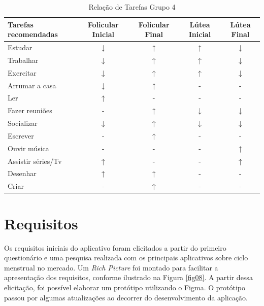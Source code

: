 \begin{table}[ht]
    \centering
    \caption{Relação de Tarefas Grupo 4}
    \label{tab14}
    \begin{tabular}{lcccc}
    \toprule
    Tarefas recomendadas  & Folicular Inicial & Folicular Final  & Lútea Inicial& Lútea Final \\ 
    \midrule
    Estudar & $\downarrow$  & $\uparrow$ & $\uparrow$ & $\downarrow$ \\ 
    \midrule
    Trabalhar & $\downarrow$ & $\uparrow$  & $\uparrow$ &  $\downarrow$  \\ 
    \midrule
    Exercitar & $\downarrow$ & $\uparrow$ & $\uparrow$ &  $\downarrow$  \\ 
    \midrule
    Arrumar a casa  & $\downarrow$ & $\uparrow$  & - & - \\ 
    \midrule
    Ler & $\uparrow$ & -  & - & - \\ 
    \midrule
    Fazer reuniões & - & $\uparrow$ & $\downarrow$ & $\downarrow$ \\ 
    \midrule
    Socializar & $\downarrow$ & $\uparrow$  & $\downarrow$ & $\downarrow$ \\ 
    \midrule
    Escrever & - & $\uparrow$  & - & - \\ 
    \midrule
    Ouvir música & - & - & - & $\uparrow$ \\ 
    \midrule
    Assistir séries/Tv & $\uparrow$ & - & - & $\uparrow$ \\ 
    \midrule
    Desenhar & $\uparrow$ & $\uparrow$  & - & - \\ 
    \midrule
    Criar & - & $\uparrow$  & - & - \\ 
    \bottomrule    
    \end{tabular}
    \end{table}

\section{Requisitos}
\label{req}

Os requisitos iniciais do aplicativo foram elicitados a partir do primeiro questionário e uma pesquisa realizada 
com os principais aplicativos sobre ciclo menstrual no mercado.  
Um \emph{Rich Picture} foi montado para facilitar a apresentação dos requisitos, conforme ilustrado na Figura \ref{fig08}.
A partir dessa elicitação, foi possível elaborar um protótipo utilizando o Figma. O protótipo passou por 
algumas atualizações ao decorrer do desenvolvimento da aplicação.

